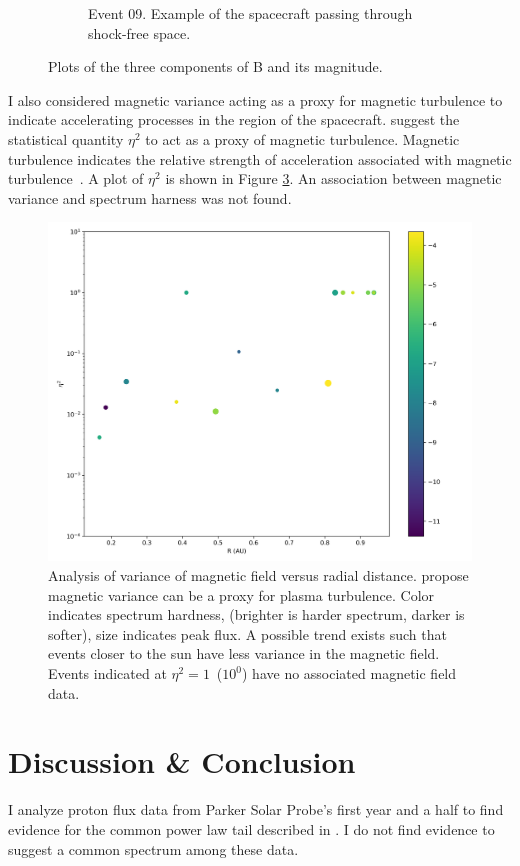 \documentclass[letterpaper,11pt]{article}
\begin{document}
\begin{figure}[htbp]
\begin{subfigure}{0.7\linewidth}
\caption{Event 09.  Example of the spacecraft passing through shock-free space.}
\label{fig:b_rtn_09}
\end{subfigure}
\caption{Plots of the three components of B and its magnitude.}
\label{fig:b_rtn}
\end{figure}

I also considered magnetic variance acting as a proxy for magnetic turbulence to indicate accelerating processes in the region of the spacecraft.  \citet{Schwadron1996} suggest the statistical quantity $\eta^2$ to act as a proxy of magnetic turbulence.  Magnetic turbulence indicates the relative strength of acceleration associated with magnetic turbulence~\citep{Fisk2006}.  A plot of $\eta^2$ is shown in Figure \ref{fig:eta_squared}.  An association between magnetic variance and spectrum harness was not found.

\begin{figure}[htbp]
\centering
\includegraphics[width=0.95\linewidth]{figures/etasq_vs_R_events.png}
\caption{Analysis of variance of magnetic field versus radial distance. \citet{Schwadron1996} propose magnetic variance can be  a  proxy  for  plasma  turbulence.    Color  indicates spectrum hardness, (brighter is harder spectrum, darker is softer), size indicates peak flux.  A possible trend exists such that events closer to the sun have less variance in the magnetic field.  Events indicated at $\eta^2 = 1$~($10^0$) have no associated magnetic field data.}
\label{fig:eta_squared}
\end{figure}



\section{Discussion \& Conclusion}
\label{sec:conclusion}
I analyze proton flux data from Parker Solar Probe's first year and a half to find evidence for the common power law tail described in \citet{Fisk2006}.  I do not find evidence to suggest a common spectrum among these data.
\end{document}
